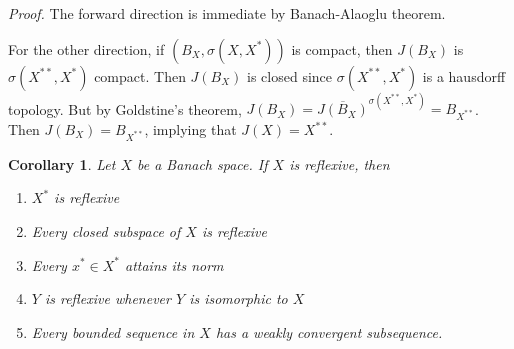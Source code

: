\documentclass[11pt, reqno]{article}
\theoremstyle{plain}
\newtheorem*{corollary}{Corollary}
\theoremstyle{definition}
\theoremstyle{remark}
\begin{document}
\textit{Proof.} The forward direction is immediate by Banach-Alaoglu theorem. 

For the other direction, if $(B_X, \sigma(X, X^*))$ is compact, then $J(B_X)$ is $\sigma(X^{**}, X^*)$ compact.
Then $J(B_X)$ is closed since $\sigma(X^{**}, X^*)$ is a hausdorff topology. But by Goldstine's theorem,
$J(B_X) = \overline{J(B_X)}^{\sigma(X^{**}, X^*)} = B_{X^{**}}$. Then $J(B_X) = B_{X^{**}}$, implying
that $J(X) = X^{**}$.

\begin{corollary}
    Let $X$ be a Banach space. If $X$ is reflexive, then 
    \begin{enumerate}
        \item $X^*$ is reflexive
        \item Every closed subspace of $X$ is reflexive
        \item Every $x^* \in X^*$ attains its norm
        \item $Y$ is reflexive whenever $Y$ is isomorphic to $X$
        \item Every bounded sequence in $X$ has a weakly convergent subsequence.
    \end{enumerate}
\end{corollary}
\end{document}
